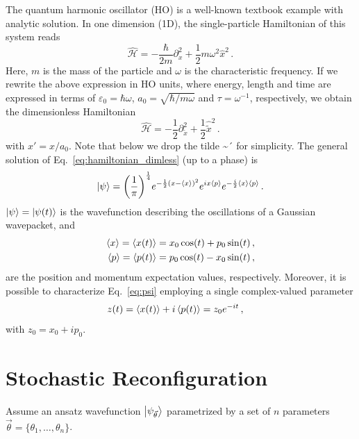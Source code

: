\documentclass[aps,pre,superscriptaddress,amsmath,amssymb,amsfonts,twocolumn,showpacs,notitlepage]{revtex4-1}
\begin{document}
	The quantum harmonic oscillator (HO) is a well-known textbook example with analytic solution.
	In one dimension (1D), the single-particle Hamiltonian of this system reads
	\begin{equation} \label{eq:hamiltonian}
		\hat{\mathcal{H}} = -\frac{\hbar}{2m}\partial_{x}^2 + \frac{1}{2}m\omega^2\hat{x}^2 \,.
	\end{equation}
	Here, $m$ is the mass of the particle and $\omega$ is the characteristic frequency.
	If we rewrite the above expression in HO units, where energy, length and time are expressed in terms of $\varepsilon_0 =\hbar\omega$, $a_0=\sqrt{\hbar/m\omega}$ and $\tau = \omega^{-1}$, respectively, we obtain the dimensionless Hamiltonian
	\begin{equation} \label{eq:hamiltonian_dimless}
		\hat{\mathcal{H}} = -\frac{1}{2}\partial_{\tilde{x}}^2 + \frac{1}{2}\hat{\tilde{x}}^2 \,.
	\end{equation}
	with $x'=x/a_0$.
	Note that below we drop the tilde \~{}´ for simplicity.
	The general solution  of Eq.~\eqref{eq:hamiltonian_dimless} (up to a phase) is
	\begin{equation} \label{eq:psi}
		\ket{\psi} = \qty(\frac{1}{\pi})^{\frac{1}{4}}e^{-\frac{1}{2}(x-\ev{x})^2}e^{ix\ev{p}}e^{-\frac{i}{2}\ev{x}\ev{p}} \,.
	\end{equation}
	$\ket{\psi}=\ket{\psi(t)}$ is the wavefunction describing the oscillations of a Gaussian wavepacket, and 
	\begin{align}
		\ev{x}=\ev{x(t)} &= x_0\cos(t) + p_0\sin(t) \,, \label{eq:x(t)}
		\\
		\ev{p}=\ev{p(t)} &= p_0\cos(t) - x_0\sin(t) \,, \label{eq:p(t)}
	\end{align}
	are the position and momentum expectation values, respectively.
	Moreover, it is possible to characterize Eq.~\eqref{eq:psi} employing a single complex-valued parameter
	\begin{align} \label{eq:z(t)}
		z(t) &= \ev{x(t)} + i\ev{p(t)} = z_0e^{-it} \,,
	\end{align}
	with $z_0=x_0+ip_0$.

\section{Stochastic Reconfiguration} \label{sec:SR}

	Assume an ansatz wavefunction $\ket{\psi_{\vec{\theta}}}$ parametrized by a set of $n$ parameters $\vec{\theta} = \{\theta_1,\dots,\theta_n\}$.
	
\end{document}
